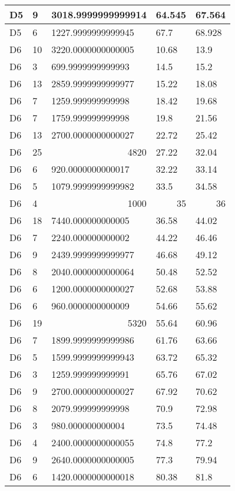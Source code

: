 \begin{longtable}{|l|l|l|l|l|}
D5 & 9 & 3018.9999999999914 & 64.545 & 67.564 \\ \hline
D5 & 6 & 1227.9999999999945 & 67.7 & 68.928 \\ \hline
D6 & 10 & 3220.0000000000005 & 10.68 & 13.9 \\ \hline
D6 & 3 & 699.9999999999993 & 14.5 & 15.2 \\ \hline
D6 & 13 & 2859.9999999999977 & 15.22 & 18.08 \\ \hline
D6 & 7 & 1259.999999999998 & 18.42 & 19.68 \\ \hline
D6 & 7 & 1759.999999999998 & 19.8 & 21.56 \\ \hline
D6 & 13 & 2700.0000000000027 & 22.72 & 25.42 \\ \hline
D6 & 25 & \multicolumn{1}{r|}{4820} & 27.22 & 32.04 \\ \hline
D6 & 6 & 920.0000000000017 & 32.22 & 33.14 \\ \hline
D6 & 5 & 1079.9999999999982 & 33.5 & 34.58 \\ \hline
D6 & 4 & \multicolumn{1}{r|}{1000} & \multicolumn{1}{r|}{35} & \multicolumn{1}{r|}{36} \\ \hline
D6 & 18 & 7440.000000000005 & 36.58 & 44.02 \\ \hline
D6 & 7 & 2240.000000000002 & 44.22 & 46.46 \\ \hline
D6 & 9 & 2439.9999999999977 & 46.68 & 49.12 \\ \hline
D6 & 8 & 2040.0000000000064 & 50.48 & 52.52 \\ \hline
D6 & 6 & 1200.0000000000027 & 52.68 & 53.88 \\ \hline
D6 & 6 & 960.0000000000009 & 54.66 & 55.62 \\ \hline
D6 & 19 & \multicolumn{1}{r|}{5320} & 55.64 & 60.96 \\ \hline
D6 & 7 & 1899.9999999999986 & 61.76 & 63.66 \\ \hline
D6 & 5 & 1599.9999999999943 & 63.72 & 65.32 \\ \hline
D6 & 3 & 1259.999999999991 & 65.76 & 67.02 \\ \hline
D6 & 9 & 2700.0000000000027 & 67.92 & 70.62 \\ \hline
D6 & 8 & 2079.999999999998 & 70.9 & 72.98 \\ \hline
D6 & 3 & 980.000000000004 & 73.5 & 74.48 \\ \hline
D6 & 4 & 2400.0000000000055 & 74.8 & 77.2 \\ \hline
D6 & 9 & 2640.0000000000005 & 77.3 & 79.94 \\ \hline
D6 & 6 & 1420.0000000000018 & 80.38 & 81.8 \\ \hline

\end{longtable}
